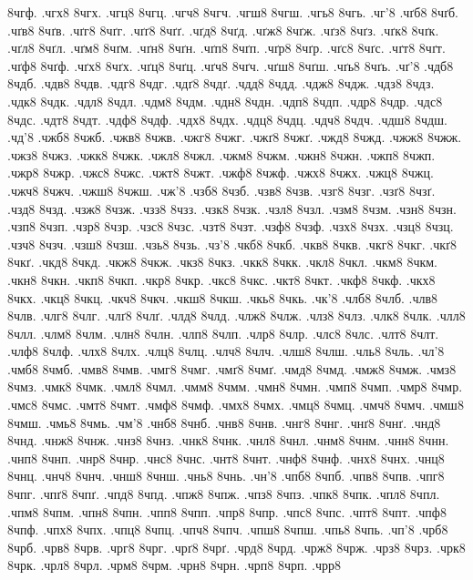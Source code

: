 {8чгф.
.чгх8
8чгх.
.чгц8
8чгц.
.чгч8
8чгч.
.чгш8
8чгш.
.чгь8
8чгь.
.чг'8
.чґб8
8чґб.
.чґв8
8чґв.
.чґг8
8чґг.
.чґґ8
8чґґ.
.чґд8
8чґд.
.чґж8
8чґж.
.чґз8
8чґз.
.чґк8
8чґк.
.чґл8
8чґл.
.чґм8
8чґм.
.чґн8
8чґн.
.чґп8
8чґп.
.чґр8
8чґр.
.чґс8
8чґс.
.чґт8
8чґт.
.чґф8
8чґф.
.чґх8
8чґх.
.чґц8
8чґц.
.чґч8
8чґч.
.чґш8
8чґш.
.чґь8
8чґь.
.чґ'8
.чдб8
8чдб.
.чдв8
8чдв.
.чдг8
8чдг.
.чдґ8
8чдґ.
.чдд8
8чдд.
.чдж8
8чдж.
.чдз8
8чдз.
.чдк8
8чдк.
.чдл8
8чдл.
.чдм8
8чдм.
.чдн8
8чдн.
.чдп8
8чдп.
.чдр8
8чдр.
.чдс8
8чдс.
.чдт8
8чдт.
.чдф8
8чдф.
.чдх8
8чдх.
.чдц8
8чдц.
.чдч8
8чдч.
.чдш8
8чдш.
.чд'8
.чжб8
8чжб.
.чжв8
8чжв.
.чжг8
8чжг.
.чжґ8
8чжґ.
.чжд8
8чжд.
.чжж8
8чжж.
.чжз8
8чжз.
.чжк8
8чжк.
.чжл8
8чжл.
.чжм8
8чжм.
.чжн8
8чжн.
.чжп8
8чжп.
.чжр8
8чжр.
.чжс8
8чжс.
.чжт8
8чжт.
.чжф8
8чжф.
.чжх8
8чжх.
.чжц8
8чжц.
.чжч8
8чжч.
.чжш8
8чжш.
.чж'8
.чзб8
8чзб.
.чзв8
8чзв.
.чзг8
8чзг.
.чзґ8
8чзґ.
.чзд8
8чзд.
.чзж8
8чзж.
.чзз8
8чзз.
.чзк8
8чзк.
.чзл8
8чзл.
.чзм8
8чзм.
.чзн8
8чзн.
.чзп8
8чзп.
.чзр8
8чзр.
.чзс8
8чзс.
.чзт8
8чзт.
.чзф8
8чзф.
.чзх8
8чзх.
.чзц8
8чзц.
.чзч8
8чзч.
.чзш8
8чзш.
.чзь8
8чзь.
.чз'8
.чкб8
8чкб.
.чкв8
8чкв.
.чкг8
8чкг.
.чкґ8
8чкґ.
.чкд8
8чкд.
.чкж8
8чкж.
.чкз8
8чкз.
.чкк8
8чкк.
.чкл8
8чкл.
.чкм8
8чкм.
.чкн8
8чкн.
.чкп8
8чкп.
.чкр8
8чкр.
.чкс8
8чкс.
.чкт8
8чкт.
.чкф8
8чкф.
.чкх8
8чкх.
.чкц8
8чкц.
.чкч8
8чкч.
.чкш8
8чкш.
.чкь8
8чкь.
.чк'8
.члб8
8члб.
.члв8
8члв.
.члг8
8члг.
.члґ8
8члґ.
.члд8
8члд.
.члж8
8члж.
.члз8
8члз.
.члк8
8члк.
.члл8
8члл.
.члм8
8члм.
.члн8
8члн.
.члп8
8члп.
.члр8
8члр.
.члс8
8члс.
.члт8
8члт.
.члф8
8члф.
.члх8
8члх.
.члц8
8члц.
.члч8
8члч.
.члш8
8члш.
.чль8
8чль.
.чл'8
.чмб8
8чмб.
.чмв8
8чмв.
.чмг8
8чмг.
.чмґ8
8чмґ.
.чмд8
8чмд.
.чмж8
8чмж.
.чмз8
8чмз.
.чмк8
8чмк.
.чмл8
8чмл.
.чмм8
8чмм.
.чмн8
8чмн.
.чмп8
8чмп.
.чмр8
8чмр.
.чмс8
8чмс.
.чмт8
8чмт.
.чмф8
8чмф.
.чмх8
8чмх.
.чмц8
8чмц.
.чмч8
8чмч.
.чмш8
8чмш.
.чмь8
8чмь.
.чм'8
.чнб8
8чнб.
.чнв8
8чнв.
.чнг8
8чнг.
.чнґ8
8чнґ.
.чнд8
8чнд.
.чнж8
8чнж.
.чнз8
8чнз.
.чнк8
8чнк.
.чнл8
8чнл.
.чнм8
8чнм.
.чнн8
8чнн.
.чнп8
8чнп.
.чнр8
8чнр.
.чнс8
8чнс.
.чнт8
8чнт.
.чнф8
8чнф.
.чнх8
8чнх.
.чнц8
8чнц.
.чнч8
8чнч.
.чнш8
8чнш.
.чнь8
8чнь.
.чн'8
.чпб8
8чпб.
.чпв8
8чпв.
.чпг8
8чпг.
.чпґ8
8чпґ.
.чпд8
8чпд.
.чпж8
8чпж.
.чпз8
8чпз.
.чпк8
8чпк.
.чпл8
8чпл.
.чпм8
8чпм.
.чпн8
8чпн.
.чпп8
8чпп.
.чпр8
8чпр.
.чпс8
8чпс.
.чпт8
8чпт.
.чпф8
8чпф.
.чпх8
8чпх.
.чпц8
8чпц.
.чпч8
8чпч.
.чпш8
8чпш.
.чпь8
8чпь.
.чп'8
.чрб8
8чрб.
.чрв8
8чрв.
.чрг8
8чрг.
.чрґ8
8чрґ.
.чрд8
8чрд.
.чрж8
8чрж.
.чрз8
8чрз.
.чрк8
8чрк.
.чрл8
8чрл.
.чрм8
8чрм.
.чрн8
8чрн.
.чрп8
8чрп.
.чрр8
}
